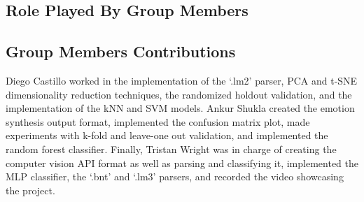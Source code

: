 \subsection{Role Played By Group Members}

\subsection{Group Members Contributions}
Diego Castillo worked in the implementation of the `.lm2' parser, PCA and t-SNE dimensionality reduction techniques, the randomized holdout validation, and the implementation of the kNN and SVM models. Ankur Shukla created the emotion synthesis output format, implemented the confusion matrix plot, made experiments with k-fold  and leave-one out validation, and implemented the random forest classifier. Finally, Tristan Wright was in charge of creating the computer vision API format as well as parsing and classifying it, implemented the MLP classifier, the `.bnt' and `.lm3' parsers, and recorded the video showcasing the project.
